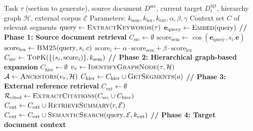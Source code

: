 \documentclass{ieeeaccess}
\begin{document}
\begin{algorithm}[!t]
\caption{Hierarchical Contextual Document Retrieval (HCDR)}
\label{alg:hcdr}
\footnotesize
\begin{algorithmic}[1]
\Require Task \(\tau\) (section to generate), source document \(D^{\text{src}}\), current target \(D^{\text{tgt}}_t\), hierarchy graph \(\mathcal{H}\), external corpus \(\mathcal{E}\)
\Require Parameters: \(k_{\text{sem}}, k_{\text{lex}}, k_{\text{ext}}, \alpha, \beta, \gamma\)
\Ensure Context set \(C\) of relevant segments
\State \(\text{query} \gets \textsc{ExtractKeywords}(\tau)\) 
\State \(\mathbf{e}_{\text{query}} \gets \textsc{Embed}(\text{query})\) 
\State
\State \textbf{// Phase 1: Source document retrieval}
\State \(C_{\text{src}} \gets \emptyset\)
    \State \(\text{score}_{\text{sem}} \gets \cos(\mathbf{e}_{\text{query}}, s_i.\mathbf{e})\) 
    \State \(\text{score}_{\text{lex}} \gets \textsc{BM25}(\text{query}, s_i.c)\) 
    \State \(\text{score}_i \gets \alpha \cdot \text{score}_{\text{sem}} + \beta \cdot \text{score}_{\text{lex}}\)
\EndFor
\State \(C_{\text{src}} \gets \textsc{TopK}(\{(s_i, \text{score}_i)\}, k_{\text{sem}})\) 
\State
\State \textbf{// Phase 2: Hierarchical graph-based expansion}
\State \(C_{\text{hier}} \gets \emptyset\)
\State \(v_{\tau} \gets \textsc{IdentifyGraphNode}(\tau, \mathcal{H})\) 
    \State \(\mathcal{A} \gets \textsc{Ancestors}(v_{\tau}, \mathcal{H})\) 
        \State \(C_{\text{hier}} \gets C_{\text{hier}} \cup \textsc{GetSegments}(a)\) 
    \EndFor
\EndIf
\State
\State \textbf{// Phase 3: External reference retrieval}
\State \(C_{\text{ext}} \gets \emptyset\)
\State \(\mathcal{R}_{\text{cited}} \gets \textsc{ExtractCitations}(C_{\text{src}} \cup C_{\text{hier}})\) 
        \State \(C_{\text{ext}} \gets C_{\text{ext}} \cup \textsc{RetrieveSummary}(r, \mathcal{E})\)
    \EndIf
\EndFor
\State \(C_{\text{ext}} \gets C_{\text{ext}} \cup \textsc{SemanticSearch}(\text{query}, \mathcal{E}, k_{\text{ext}})\) 
\State
\State \textbf{// Phase 4: Target document context}

\end{algorithmic}
\end{algorithm}
\end{document}
